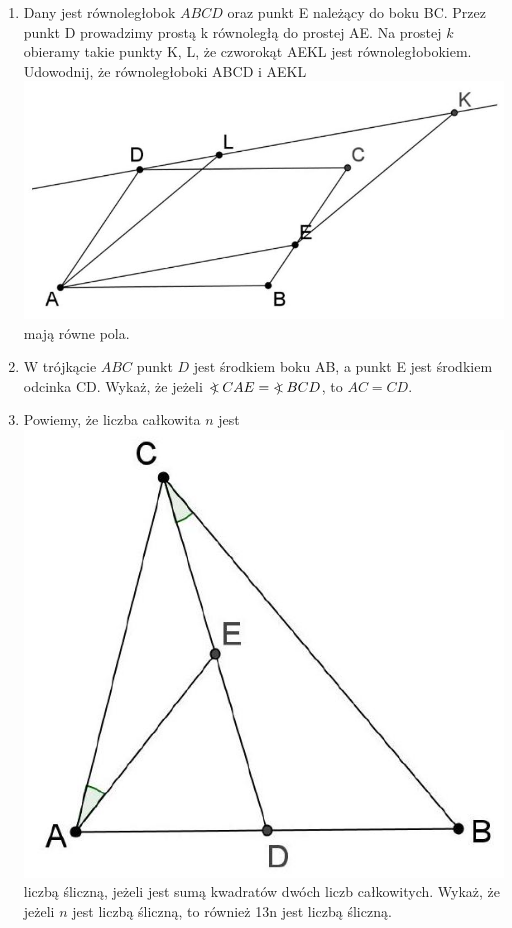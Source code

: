 \documentclass[10pt]{article}
\newcommand\Varangle{\mathop{{<\!\!\!\!\!\text{\small)}}\:}\nolimits}
\begin{document}
\begin{enumerate}
  \item Dany jest równoległobok \(A B C D\) oraz punkt E należący do boku BC. Przez punkt D prowadzimy prostą k równoległą do prostej AE. Na prostej \(k\) obieramy takie punkty K, L, że czworokąt AEKL jest równoległobokiem. Udowodnij, że równoległoboki ABCD i AEKL\\
\includegraphics[max width=\textwidth, center]{2024_11_21_5466f38b424164372e40g-1(1)}\\
mają równe pola.
  \item W trójkącie \(A B C\) punkt \(D\) jest środkiem boku AB, a punkt E jest środkiem odcinka CD. Wykaż, że jeżeli \(\Varangle C A E=\Varangle B C D\), to \(A C=C D\).
  \item Powiemy, że liczba całkowita \(n\) jest\\
\includegraphics[max width=\textwidth, center]{2024_11_21_5466f38b424164372e40g-1}\\
liczbą śliczną, jeżeli jest sumą kwadratów dwóch liczb całkowitych. Wykaż, że jeżeli \(n\) jest liczbą śliczną, to również 13n jest liczbą śliczną.
\end{enumerate}
\end{document}
